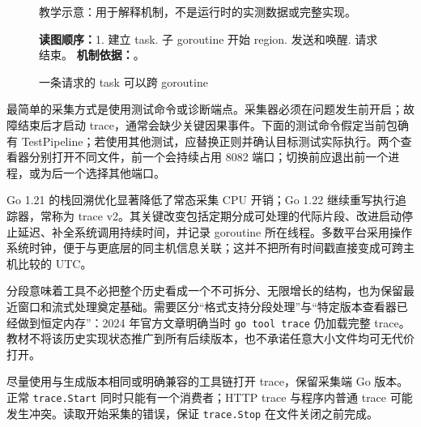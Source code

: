 \documentclass[UTF8,fontset=fandol,openany,11pt]{ctexbook}
\begin{document}
\begin{figure}[H]
\caption{一条请求的 task 可以跨 goroutine}\label{fig:08-trace}
\begin{minipage}{0.96\linewidth}\footnotesize 教学示意：用于解释机制，不是运行时的实测数据或完整实现。

\textbf{读图顺序：}1. 建立 task. 子 goroutine 开始 region. 发送和唤醒. 请求结束。
\textbf{机制依据：}\cite{tools-trace-annotation}。
\end{minipage}
\end{figure}
最简单的采集方式是使用测试命令或诊断端点。采集器必须在问题发生前开启；故障结束后才启动 trace，通常会缺少关键因果事件。下面的测试命令假定当前包确有 TestPipeline；若使用其他测试，应替换正则并确认目标测试实际执行。两个查看器分别打开不同文件，前一个会持续占用 8082 端口；切换前应退出前一个进程，或为后一个选择其他端口。


Go 1.21 的栈回溯优化显著降低了常态采集 CPU 开销；Go 1.22 继续重写执行追踪器，常称为 trace v2。其关键改变包括定期分成可处理的代际片段、改进启动停止延迟、补全系统调用持续时间，并记录 goroutine 所在线程。多数平台采用操作系统时钟，便于与更底层的同主机信息关联；这并不把所有时间戳直接变成可跨主机比较的 UTC。\cite{tools-go122}\cite{tools-trace2024}

分段意味着工具不必把整个历史看成一个不可拆分、无限增长的结构，也为保留最近窗口和流式处理奠定基础。需要区分“格式支持分段处理”与“特定版本查看器已经做到恒定内存”：2024 年官方文章明确当时 \texttt{go tool trace} 仍加载完整 trace。教材不将该历史实现状态推广到所有后续版本，也不承诺任意大小文件均可无代价打开。

尽量使用与生成版本相同或明确兼容的工具链打开 trace，保留采集端 Go 版本。正常 \texttt{trace.\allowbreak{}Start} 同时只能有一个消费者；HTTP trace 与程序内普通 trace 可能发生冲突。读取开始采集的错误，保证 \texttt{trace.\allowbreak{}Stop} 在文件关闭之前完成。\cite{tools-trace-doc}
\end{document}
